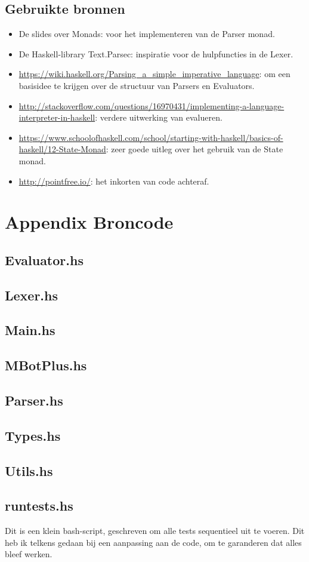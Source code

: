 \documentclass[12pt,a4paper]{report}
\begin{document}
\section{Gebruikte bronnen}
\begin{itemize}
  \item De slides over Monads: voor het implementeren van de Parser monad.
  \item De Haskell-library Text.Parsec: inspiratie voor de hulpfuncties in de Lexer.
  \item \url{https://wiki.haskell.org/Parsing_a_simple_imperative_language}: om een basisidee te krijgen over de structuur van Parsers en Evaluators.
  \item   \sloppy\url{http://stackoverflow.com/questions/16970431/implementing-a-language-interpreter-in-haskell}: verdere uitwerking van evalueren.
  \item \sloppy\url{https://www.schoolofhaskell.com/school/starting-with-haskell/basics-of-haskell/12-State-Monad}: zeer goede uitleg over het gebruik van de State monad.
  \item \url{http://pointfree.io/}: het inkorten van code achteraf.
\end{itemize}
\newpage
\chapter{Appendix Broncode}

\section{Evaluator.hs}

\newpage
\section{Lexer.hs}

\newpage
\section{Main.hs}

\newpage
\section{MBotPlus.hs}

\newpage
\section{Parser.hs}

\newpage
\section{Types.hs}

\newpage
\section{Utils.hs}

\section{runtests.hs}
Dit is een klein bash-script, geschreven om alle tests sequentieel uit te voeren. Dit heb ik telkens gedaan bij een aanpassing aan de code, om te garanderen dat alles bleef werken.

\end{document}
